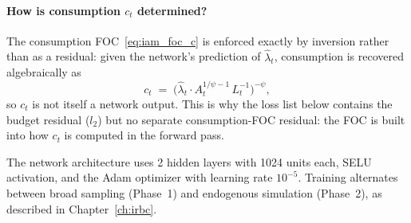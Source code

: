 \documentclass[11pt,a4paper]{report}
\begin{document}
\paragraph{How is consumption $c_t$ determined?}
The consumption FOC~\eqref{eq:iam_foc_c} is enforced exactly by inversion rather than as a residual: given the network's prediction of $\hat{\lambda}_t$, consumption is recovered algebraically as
\begin{equation}
c_t \;=\; \bigl(\hat{\lambda}_t \cdot A_t^{1/\psi - 1}\,L_t^{-1}\bigr)^{-\psi},
\label{eq:iam_c_recovery}
\end{equation}
so $c_t$ is not itself a network output.  This is why the loss list below contains the budget residual ($l_2$) but no separate consumption-FOC residual: the FOC is built into how $c_t$ is computed in the forward pass.

The network architecture uses 2 hidden layers with 1024 units each, SELU activation, and the Adam optimizer with learning rate $10^{-5}$.  Training alternates between broad sampling (Phase~1) and endogenous simulation (Phase~2), as described in Chapter~\ref{ch:irbc}.
\end{document}

